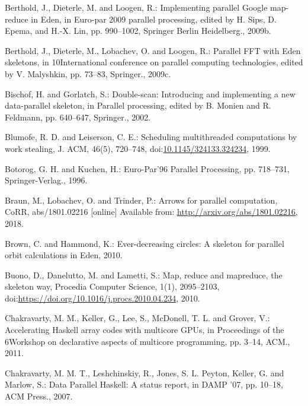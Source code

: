 \documentclass[paper=A4,twoside=true,openright,parskip=full,chapterprefix=true,headings=normal,bibliography=totoc,listof=totoc,titlepage=on,captions=tableabove,draft=false,british]{scrreprt}%
\begin{document}
\leavevmode\hypertarget{ref-Berthold2009-mr}{}%
Berthold, J., Dieterle, M. and Loogen, R.: Implementing parallel Google
map-reduce in Eden, in Euro-par 2009 parallel processing, edited by H.
Sips, D. Epema, and H.-X. Lin, pp. 990--1002, Springer Berlin
Heidelberg., 2009b.

\leavevmode\hypertarget{ref-Berthold2009-fft}{}%
Berthold, J., Dieterle, M., Lobachev, O. and Loogen, R.: Parallel FFT
with Eden skeletons, in 10International conference on parallel computing
technologies, edited by V. Malyshkin, pp. 73--83, Springer., 2009c.

\leavevmode\hypertarget{ref-Bischof2002}{}%
Bischof, H. and Gorlatch, S.: Double-scan: Introducing and implementing
a new data-parallel skeleton, in Parallel processing, edited by B.
Monien and R. Feldmann, pp. 640--647, Springer., 2002.

\leavevmode\hypertarget{ref-Blumofe:1999:SMC:324133.324234}{}%
Blumofe, R. D. and Leiserson, C. E.: Scheduling multithreaded
computations by work stealing, J. ACM, 46(5), 720--748,
doi:\href{https://doi.org/10.1145/324133.324234}{10.1145/324133.324234},
1999.

\leavevmode\hypertarget{ref-botorog1996efficient}{}%
Botorog, G. H. and Kuchen, H.: Euro-Par'96 Parallel Processing, pp.
718--731, Springer-Verlag., 1996.

\leavevmode\hypertarget{ref-PArrowsPaper}{}%
Braun, M., Lobachev, O. and Trinder, P.: Arrows for parallel
computation, CoRR, abs/1801.02216 {[}online{]} Available from:
\url{http://arxiv.org/abs/1801.02216}, 2018.

\leavevmode\hypertarget{ref-brown2010ever}{}%
Brown, C. and Hammond, K.: Ever-decreasing circles: A skeleton for
parallel orbit calculations in Eden, 2010.

\leavevmode\hypertarget{ref-BUONO20102095}{}%
Buono, D., Danelutto, M. and Lametti, S.: Map, reduce and mapreduce, the
skeleton way, Procedia Computer Science, 1(1), 2095--2103,\\
doi:\href{https://doi.org/https://doi.org/10.1016/j.procs.2010.04.234}{https://doi.org/10.1016/j.procs.2010.04.234},
2010.

\leavevmode\hypertarget{ref-Chakravarty:2011:AHA:1926354.1926358}{}%
Chakravarty, M. M., Keller, G., Lee, S., McDonell, T. L. and Grover, V.:
Accelerating Haskell array codes with multicore GPUs, in Proceedings of
the 6Workshop on declarative aspects of multicore programming, pp.
3--14, ACM., 2011.

\leavevmode\hypertarget{ref-Chakravarty2007}{}%
Chakravarty, M. M. T., Leshchinskiy, R., Jones, S. L. Peyton, Keller, G.
and Marlow, S.: Data Parallel Haskell: A status report, in DAMP '07, pp.
10--18, ACM Press., 2007.
\end{document}
